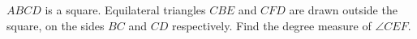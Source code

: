 $ABCD$ is a square. Equilateral triangles $CBE$ and $CFD$ are drawn outside the square, on the sides $BC$ and $CD$ respectively. Find the degree measure of $\angle CEF$.
